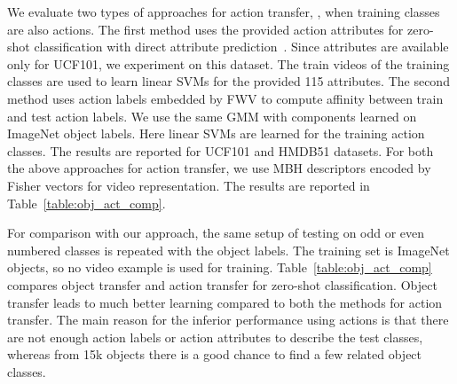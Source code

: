 {We evaluate two types of approaches for action transfer, \ie, when training classes are also actions. 
The first method uses the provided action attributes for zero-shot classification with direct attribute prediction~\cite{lampert09cvpr}. Since attributes are available only for 
UCF101, we experiment on this dataset. The train videos of the training classes are used to learn linear SVMs for the provided 115 attributes. 
The second method uses action labels embedded by FWV to compute affinity between train and test action labels. We use the same GMM with  components learned on 
ImageNet object labels. Here linear SVMs are learned for the training action classes. The results are reported for UCF101 and HMDB51 datasets.
For both the above approaches for action transfer, we use MBH descriptors encoded by Fisher vectors for video representation.
The results are reported in Table~\ref{table:obj_act_comp}.}

{For comparison with our approach, the same setup of testing on odd or even numbered classes is repeated with the object labels. The training set is ImageNet objects, so no video example 
is used for training.}
Table~\ref{table:obj_act_comp} compares object transfer and action transfer for zero-shot classification. 
{Object transfer leads to much better learning compared to both the methods for action transfer.}
The main reason for the inferior performance using actions is that there are not enough action labels or action attributes to describe the test classes, whereas from 15k objects there is 
a good chance to find a few related object classes.

\begin{comment}
\begin{table}[t]
\centering
{\small
\begin{tabular}{| l | c | c | c | c | }
\hline
{\bf Training}	&  \multicolumn{2}{c|} {\bf UCF101}	&	\multicolumn{2}{c|} {\bf HMDB51}	\\	\cline{2-5}
{\bf source} 	&    {\bf Odd} &   {\bf Even}		&  {\bf Odd} 	& {\bf Even}    \\      \hline
Actions		&    14.1\%      &    14.2\%        	&  8.2\% 	&  9.1\%  	\\	\hline
Objects		&    26.6\%      &    18.6\%        	& 14.3\% 	& 12.7\%    \\  \hline
\end{tabular}}
\caption{Object transfer compared with action transfer in a conventional zero-shot set-up. Note the supremacy of object without the need for action classes during training.}
\label{table:obj_act_comp}
\end{table}
\end{comment}


